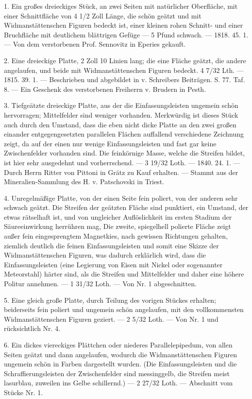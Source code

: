 \documentclass[a4paper, 11pt, oneside, polutonikogreek, german]{article}
\begin{document}
1. Ein großes dreieckiges Stück, an zwei Seiten mit natürlicher Oberfläche, mit einer Schnittfläche von 4 1/2 Zoll Länge, die schön geätzt und mit Widmanstättenschen Figuren bedeckt ist, einer kleinen rohen Schnitt- und einer Bruchfläche mit deutlichem blättrigen Gefüge — 5 Pfund schwach. — 1818. 45. 1. — Von dem verstorbenen Prof. Sennovitz in Eperies gekauft.

2. Eine dreieckige Platte, 2 Zoll 10 Linien lang; die eine Fläche geätzt, die andere angelaufen, und beide mit Widmanstättenschen Figuren bedeckt. 4 7/32 Lth. — 1815. 39. 1. — Beschrieben und abgebildet in v. Schreibers Beiträgen. S. 77. Taf. 8. — Ein Geschenk des verstorbenen Freiherrn v. Brudern in Pesth.

3. Tiefgeätzte dreieckige Platte, aus der die Einfassungsleisten ungemein schön hervorragen; Mittelfelder sind weniger vorhanden. Merkwürdig ist dieses Stück auch durch den Umstand, dass die eben nicht dicke Platte an den zwei großen einander entgegengesetzten parallelen Flächen auffallend verschiedene Zeichnung zeigt, da auf der einen nur wenige Einfassungsleisten und fast gar keine Zwischenfelder vorhanden sind. Die feinkörnige Masse, welche die Streifen bildet, ist hier sehr ausgedehnt und vorherrschend. — 3 19/32 Loth. — 1840. 24. 1. — Durch Herrn Ritter von Pittoni in Grätz zu Kauf erhalten. — Stammt aus der Mineralien-Sammlung des H. v. Patschovski in Triest.

4. Unregelmäßige Platte, von der einen Seite fein poliert, von der anderen sehr schwach geätzt. Die Streifen der geätzten Fläche sind punktiert, ein Umstand, der etwas rätselhaft ist, und von ungleicher Auflöslichkeit im ersten Stadium der Säureeinwirkung herrühren mag, Die zweite, spiegelhell polierte Fläche zeigt außer fein eingesprengtem Magnetkies, nach gewissen Richtungen gehalten, ziemlich deutlich die feinen Einfassungsleisten und somit eine Skizze der Widmanstättenschen Figuren, was dadurch erklärlich wird, dass die Einfassungsleisten (eine Legierung von Eisen mit Nickel oder sogenannter Meteorstahl) härter sind, als die Streifen und Mittelfelder und daher eine höhere Politur annehmen. — 1 31/32 Loth. — Von Nr. 1 abgeschnitten.

5. Eine gleich große Platte, durch Teilung des vorigen Stückes erhalten; beiderseits fein poliert und ungemein schön angelaufen, mit den vollkommensten Widmanstättenschen Figuren geziert. — 2 5/32 Loth. — Von Nr. 1 und rücksichtlich Nr. 4.

6. Ein dickes viereckiges Plättchen oder niederes Parallelepipedum, von allen Seiten geätzt und dann angelaufen, wodurch die Widmanstättenschen Figuren ungemein schön in Farben dargestellt wurden. (Die Einfassungsleisten und die Schraffierungsleisten der Zwischenfelder sind messinggelb, die Streifen meist lasurblau, zuweilen ins Gelbe schillernd.) — 2 27/32 Loth. — Abschnitt vom Stücke Nr. 1.
\end{document}
